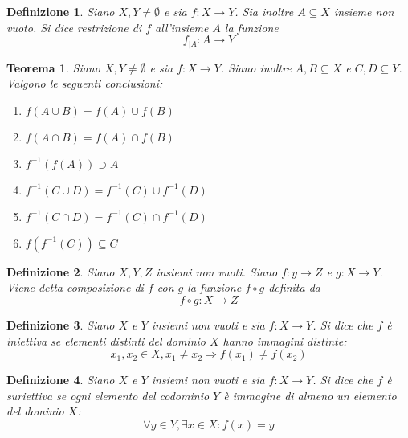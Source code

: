 \documentclass[11pt]{book}
\newtheorem{theorem}{Teorema}[chapter]
\newtheorem{definition}{Definizione}[chapter]
\begin{document}
\begin{definition}
    Siano $X,Y \neq \emptyset$ e sia $f:X\rightarrow Y$. Sia inoltre $A\subseteq X$ insieme non vuoto. Si dice restrizione 
    di $f$ all'insieme $A$ la funzione 
    \begin{equation*}
        f_{|A}:A\rightarrow Y
    \end{equation*}
\end{definition}
\begin{theorem}
    Siano $X,Y \neq \emptyset$ e sia $f:X\rightarrow Y$. Siano inoltre $A,B\subseteq X$ e $C,D\subseteq Y$. Valgono le 
    seguenti conclusioni:
    \begin{enumerate}
        \item $f(A\cup B)=f(A)\cup f(B)$
        \item $f(A\cap B)=f(A)\cap f(B)$
        \item $f^{-1}(f(A))\supset A$
        \item $f^{-1}(C\cup D)=f^{-1}(C)\cup f^{-1}(D)$
        \item $f^{-1}(C\cap D)=f^{-1}(C)\cap f^{-1}(D)$
        \item $f(f^{-1}(C))\subseteq C$
    \end{enumerate}
\end{theorem}
\begin{definition}
    Siano $X,Y,Z$ insiemi non vuoti. Siano $f:y\rightarrow Z$ e $g:X\rightarrow Y$. Viene detta composizione di $f$ con 
    $g$ la funzione $f\circ g$ definita da
    \begin{equation*}
        f\circ g:X\rightarrow Z
    \end{equation*}
\end{definition}
\begin{definition}
    Siano $X$ e $Y$ insiemi non vuoti e sia $f:X\rightarrow Y$. Si dice che $f$ è iniettiva se elementi distinti del dominio 
    $X$ hanno immagini distinte:
    \begin{equation*}
        x_1,x_2\in X,x_1\neq x_2\Rightarrow f(x_1)\neq f(x_2)
    \end{equation*}
\end{definition}
\begin{definition}
    Siano $X$ e $Y$ insiemi non vuoti e sia $f:X\rightarrow Y$. Si dice che $f$ è suriettiva se ogni elemento del codominio 
    $Y$ è immagine di almeno un elemento del dominio $X$:
    \begin{equation*}
        \forall y\in Y, \exists x\in X:f(x)=y
    \end{equation*}
\end{definition}
\end{document}
